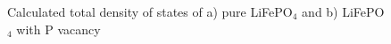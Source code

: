 \begin{figure}[h!]
\begin{minipage}[h]{0.45\linewidth}
\end{minipage}
\hfill
\begin{minipage}[ht]{0.45\linewidth}
\end{minipage}
\caption{Calculated total density of states of a) pure LiFePO$_4$ and b) LiFePO$_4$ with P vacancy}
\label{ris:0DOS}
\end{figure}

